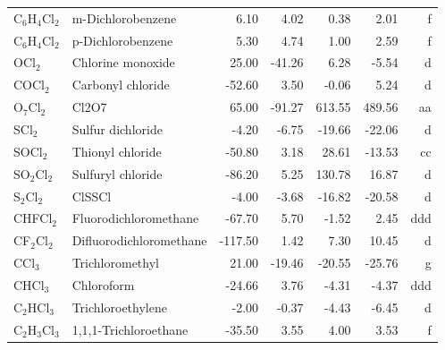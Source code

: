 \begin{table}
\begin{center}
\begin{tabular}{llrrrrr}
 C$_6$H$_4$Cl$_2$     & m-Dichlorobenzene               &     6.10    &     4.02  &     0.38  &     2.01  &      f\\
 C$_6$H$_4$Cl$_2$     & p-Dichlorobenzene               &     5.30    &     4.74  &     1.00  &     2.59  &      f\\
 OCl$_2$        & Chlorine monoxide               &    25.00    &   -41.26  &     6.28  &    -5.54  &      d\\
 COCl$_2$       & Carbonyl chloride               &   -52.60    &     3.50  &    -0.06  &     5.24  &      d\\
 O$_7$Cl$_2$       & Cl2O7                           &    65.00    &   -91.27  &   613.55  &   489.56  &     aa\\
 SCl$_2$        & Sulfur dichloride               &    -4.20    &    -6.75  &   -19.66  &   -22.06  &      d\\
 SOCl$_2$       & Thionyl chloride                &   -50.80    &     3.18  &    28.61  &   -13.53  &     cc\\
 SO$_2$Cl$_2$      & Sulfuryl chloride               &   -86.20    &     5.25  &   130.78  &    16.87  &      d\\
 S$_2$Cl$_2$       & ClSSCl                          &    -4.00    &    -3.68  &   -16.82  &   -20.58  &      d\\
 CHFCl$_2$      & Fluorodichloromethane           &   -67.70    &     5.70  &    -1.52  &     2.45  &    ddd\\
 CF$_2$Cl$_2$      & Difluorodichloromethane         &  -117.50    &     1.42  &     7.30  &    10.45  &      d\\
 CCl$_3$        & Trichloromethyl                 &    21.00    &   -19.46  &   -20.55  &   -25.76  &      g\\
 CHCl$_3$       & Chloroform                      &   -24.66    &     3.76  &    -4.31  &    -4.37  &    ddd\\
 C$_2$HCl$_3$      & Trichloroethylene               &    -2.00    &    -0.37  &    -4.43  &    -6.45  &      d\\
 C$_2$H$_3$Cl$_3$     & 1,1,1-Trichloroethane           &   -35.50    &     3.55  &     4.00  &     3.53  &      f\\
\hline
\end{tabular}
\end{center}
\end{table}
\clearpage

